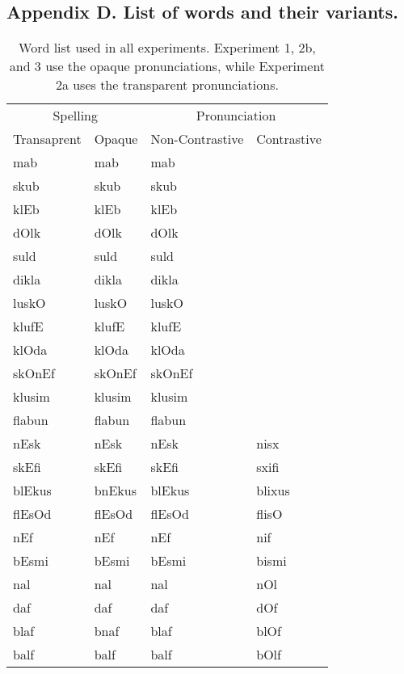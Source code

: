 \documentclass[doc,floatsintext]{apa6}
\begin{document}
\begin{appendix}
\section{}
\subsection{Appendix D. List of words and their
variants.}\label{appendix-c}

\begin{table}[!h]

\caption{\label{tab:unnamed-chunk-6}Word list used in all experiments. Experiment 1, 2b, and 3 use the opaque pronunciations, while Experiment 2a uses the transparent pronunciations.}
\centering
\fontsize{8}{10}\selectfont
\begin{tabular}{llll}
\toprule
\multicolumn{2}{c}{Spelling} & \multicolumn{2}{c}{Pronunciation} \\
\cmidrule(l{3pt}r{3pt}){1-2} \cmidrule(l{3pt}r{3pt}){3-4}
Transaprent & Opaque & Non-Contrastive & Contrastive\\
\midrule
mab & mab & mab & \\
skub & skub & skub & \\
klEb & klEb & klEb & \\
dOlk & dOlk & dOlk & \\
suld & suld & suld & \\
dikla & dikla & dikla & \\
luskO & luskO & luskO & \\
klufE & klufE & klufE & \\
klOda & klOda & klOda & \\
skOnEf & skOnEf & skOnEf & \\
klusim & klusim & klusim & \\
flabun & flabun & flabun & \\
nEsk & nEsk & nEsk & nisx\\
skEfi & skEfi & skEfi & sxifi\\
blEkus & bnEkus & blEkus & blixus\\
flEsOd & flEsOd & flEsOd & flisO\\
nEf & nEf & nEf & nif\\
bEsmi & bEsmi & bEsmi & bismi\\
nal & nal & nal & nOl\\
daf & daf & daf & dOf\\
blaf & bnaf & blaf & blOf\\
balf & balf & balf & bOlf\\

\end{tabular}
\end{table}
\end{appendix}
\end{document}
